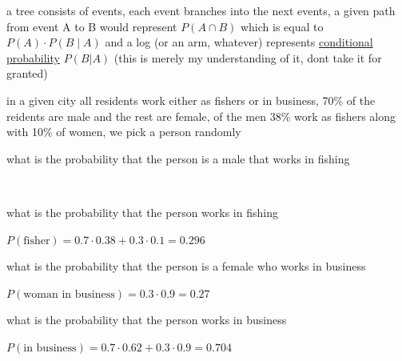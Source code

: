 \documentclass[a4paper,12pt]{article}
\newcommand{\?}{\stackrel{?}{=}}
\begin{document}
\newenvironment{note}
  {\begin{bclogo}[logo=\bcinfo, couleurBarre=orange, couleur=lightgray]{ note}}
  {\end{bclogo}}
\newenvironment{attention}
  {\begin{bclogo}[logo=\bcattention, couleurBarre=red, noborder=true, 
                couleur=red!15]{Important!}}
  {\end{bclogo}}

\begin{characteristic}
a tree consists of events, each event branches into the next events, a given path from event A to B would represent \(P(A \cap B)\) which is equal to \(P(A) \cdot P(B\mid A)\) and a log (or an arm, whatever) represents \href{probability.org}{conditional probability} \(P(B|A)\) (this is merely my understanding of it, dont take it for granted)\\[0pt]
\end{characteristic}
\begin{question}
in a given city all residents work either as fishers or in business, 70\% of the reidents are male and the rest are female, of the men 38\% work as fishers along with 10\% of women, we pick a person randomly\\[0pt]
\begin{subquestion}
what is the probability that the person is a male that works in fishing\\[0pt]
\begin{answer}
\begin{center}

\end{center}\\[0pt]
\end{answer}
\end{subquestion}
\begin{subquestion}
what is the probability that the person works in fishing\\[0pt]
\begin{answer}
\(P(\text{fisher}) = 0.7 \cdot 0.38 + 0.3 \cdot 0.1 = 0.296\)\\[0pt]
\end{answer}
\end{subquestion}
\begin{subquestion}
what is the probability that the person is a female who works in business\\[0pt]
\begin{answer}
\(P(\text{woman in business}) = 0.3 \cdot 0.9 = 0.27\)\\[0pt]
\end{answer}
\end{subquestion}
\begin{subquestion}
what is the probability that the person works in business\\[0pt]
\begin{answer}
\(P(\text{in business}) = 0.7 \cdot 0.62 + 0.3 \cdot 0.9 = 0.704\)\\[0pt]
\end{answer}
\end{subquestion}
\end{question}
\end{document}
